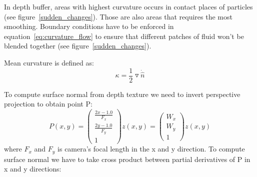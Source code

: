 In depth buffer, areas with highest curvature occurs in contact places of particles (see figure~\ref{sudden_changes}). Those are also areas that requires the most smoothing. Boundary conditions have to be enforced in equation~\ref{eq:curvature_flow} to ensure that different patches of fluid won't be blended together (see figure~\ref{sudden_changes}).


Mean curvature is defined as:
\begin{equation} \label{eq:mean_curvature}
\kappa = \frac{1}{2} \triangledown \dot \hat{n}
\end{equation}

To compute surface normal from depth texture we need to invert perspective projection to obtain point P:
\begin{equation}
P(x, y) = 
\begin{pmatrix}
\frac{2x -1.0}{F_x} \\
\frac{2y -1.0}{F_y} \\
1
\end{pmatrix}
z(x,y) = 
\begin{pmatrix}
W_x \\
W_y \\
1
\end{pmatrix} z(x,y)
\end{equation}
where $F_x$ and $F_y$ is camera's focal length in the x and y direction. To compute surface normal we have to take cross product between partial derivatives of P in x and y directions:

